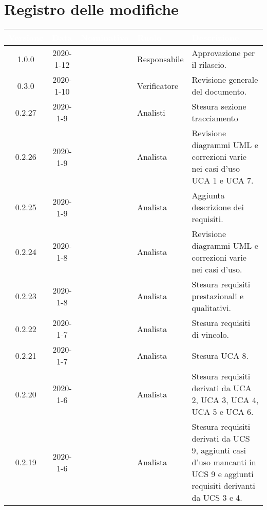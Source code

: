 \section*{Registro delle modifiche}
\setcounter{table}{-1}
{

\renewcommand{\arraystretch}{1.5}
\centering
\begin{longtable}{ c c  C{4cm}  C{3cm} C{4cm}}
   \textcolor{white}{\textbf{Versione}} &
   \textcolor{white}{\textbf{Data}}&
   \textcolor{white}{\textbf{Nominativo}}&
   \textcolor{white}{\textbf{Ruolo}}&
   \textcolor{white}{\textbf{Descrizione}}\\
   \endhead


1.0.0 & 2020-1-12 & \AT{} & Responsabile & Approvazione per il rilascio. \\

0.3.0 & 2020-1-10 & \SE{} & Verificatore & Revisione generale del documento. \\

0.2.27 & 2020-1-9 & \CE{} \PF{} \DF{} & Analisti & Stesura sezione tracciamento \\

0.2.26 & 2020-1-9 & \PF{} & Analista & Revisione diagrammi UML e correzioni varie nei casi d'uso UCA 1 e UCA 7. \\

0.2.25 & 2020-1-9 & \CE{} & Analista & Aggiunta descrizione dei requisiti. \\

0.2.24 & 2020-1-8 & \CE{} & Analista & Revisione diagrammi UML e correzioni varie nei casi d'uso. \\

0.2.23 & 2020-1-8 & \DF{} & Analista & Stesura requisiti prestazionali e qualitativi. \\

0.2.22 & 2020-1-7 & \PF{} & Analista & Stesura requisiti di vincolo. \\

0.2.21 & 2020-1-7 & \PF{} & Analista & Stesura UCA 8. \\

0.2.20 & 2020-1-6 & \PF{} & Analista & Stesura requisiti derivati da UCA 2, UCA 3, UCA 4, UCA 5 e UCA 6. \\

0.2.19 & 2020-1-6 & \DF{} & Analista & Stesura requisiti derivati da UCS 9, aggiunti casi d'uso mancanti in UCS 9 e aggiunti requisiti derivanti da UCS 3 e 4. \\


\end{longtable}}
